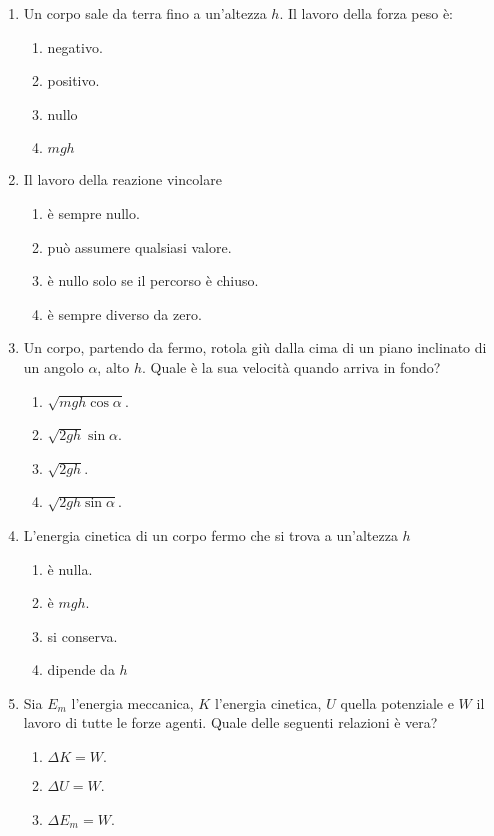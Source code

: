 \documentclass{article}
\begin{document}
\begin{enumerate}
  \item Un corpo sale da terra fino a un'altezza $h$. Il lavoro della forza peso è:
  \begin{enumerate}[label=\Alph*.]
    \item negativo.
    \item positivo.
    \item nullo
    \item $mgh$
  \end{enumerate}
  \item Il lavoro della reazione vincolare
  \begin{enumerate}[label=\Alph*.]
    \item è sempre nullo.
    \item può assumere qualsiasi valore.
    \item è nullo solo se il percorso è chiuso.
    \item è sempre diverso da zero.
  \end{enumerate}
  \item Un corpo, partendo da fermo, rotola giù dalla cima di un piano inclinato di un angolo $\alpha$, alto $h$. Quale è la sua velocità quando arriva in fondo?
  \begin{enumerate}[label=\Alph*.]
    \item $\sqrt{mgh\cos\alpha}$.
    \item $\sqrt{2gh}\sin\alpha$.
    \item $\sqrt{2gh}$.
    \item $\sqrt{2gh\sin\alpha}$.
  \end{enumerate}
  \item L'energia cinetica di un corpo fermo che si trova a un'altezza $h$
  \begin{enumerate}[label=\Alph*.]
    \item è nulla.
    \item è $mgh$.
    \item si conserva.
    \item dipende da $h$
  \end{enumerate}
  \item Sia $E_m$ l'energia meccanica, $K$ l'energia cinetica, $U$ quella potenziale e $W$ il lavoro di tutte le forze agenti. Quale delle seguenti relazioni è vera?
  \begin{enumerate}[label=\Alph*.]
    \item $\Delta K=W.$
    \item $\Delta U=W$.
    \item $\Delta E_m=W$.

\end{enumerate}
\end{enumerate}
\end{document}
